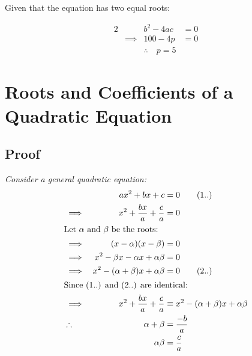\documentclass[12pt, a4paper]{report}
\theoremstyle{definition}
\begin{document}
	Given that the equation has two equal roots:
	
	\begin{alignat*}{2}
		&          & b^2-4ac                        & = 0 \\
		& \implies & 100-4p                         & = 0 \\
		&          & \boxed{\therefore \quad p = 5} &     
	\end{alignat*}
	
	\newpage
	\section{Roots and Coefficients of a Quadratic Equation}
	\subsection{Proof}
	\emph{Consider a general quadratic equation:}
	\begin{alignat*}{2}
		&            & ax^2+bx+c                            & = 0 \tag{1..}                              \\
		& \implies   & x^2 +\frac{bx}{a} + \frac{c}{a}      & = 0                                        \\
		\intertext{Let $\alpha$  and $\beta$  be the roots:}
		& \implies   & (x-\alpha)(x-\beta)                  & = 0                                        \\
		& \implies   & x^2 -\beta x -\alpha x + \alpha\beta & = 0                                        \\
		& \implies   & x^2-(\alpha + \beta)x + \alpha\beta  & = 0\tag{2..}                               \\
		\intertext{Since (1..) and (2..) are identical:}
		& \implies   & x^2 +\frac{bx}{a} + \frac{c}{a}      & \equiv x^2-(\alpha + \beta)x + \alpha\beta \\
		& \therefore & \alpha + \beta                       & = \frac{-b}{a}                             \\ 
		&            & \alpha\beta                          & = \frac{c}{a}                              
	\end{alignat*}
	\hrulefill
	
\end{document}
